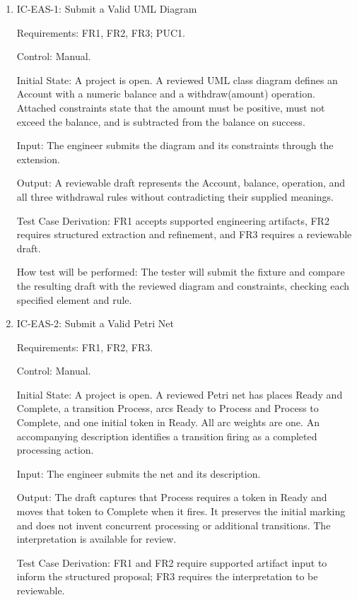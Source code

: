 \documentclass[12pt, titlepage]{article}
\begin{document}
\begin{enumerate}

\item{IC-EAS-1: Submit a Valid UML Diagram\\}

Requirements: FR1, FR2, FR3; PUC1.

Control: Manual.

Initial State: A project is open. A reviewed UML class diagram defines an
Account with a numeric balance and a withdraw(amount) operation. Attached
constraints state that the amount must be positive, must not exceed the
balance, and is subtracted from the balance on success.

Input: The engineer submits the diagram and its constraints through the
extension.

Output: A reviewable draft represents the Account, balance, operation, and all
three withdrawal rules without contradicting their supplied meanings.

Test Case Derivation: FR1 accepts supported engineering artifacts, FR2
requires structured extraction and refinement, and FR3 requires a reviewable
draft.

How test will be performed: The tester will submit the fixture and compare the
resulting draft with the reviewed diagram and constraints, checking each
specified element and rule.

\item{IC-EAS-2: Submit a Valid Petri Net\\}

Requirements: FR1, FR2, FR3.

Control: Manual.

Initial State: A project is open. A reviewed Petri net has places Ready and
Complete, a transition Process, arcs Ready to Process and Process to Complete,
and one initial token in Ready. All arc weights are one. An accompanying
description identifies a transition firing as a completed processing action.

Input: The engineer submits the net and its description.

Output: The draft captures that Process requires a token in Ready and moves
that token to Complete when it fires. It preserves the initial marking and
does not invent concurrent processing or additional transitions. The
interpretation is available for review.

Test Case Derivation: FR1 and FR2 require supported artifact input to inform
the structured proposal; FR3 requires the interpretation to be reviewable.


\end{enumerate}
\end{document}
